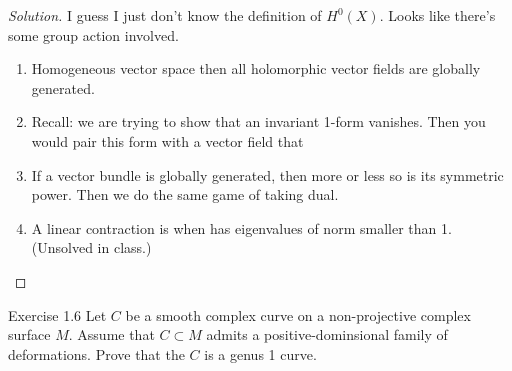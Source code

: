 \begin{proof}[Solution]\leavevmode
I guess I just don't know the definition of  \(H^{0}(X)\). Looks like there's some group action involved.
\begin{enumerate}[label=(\alph*)]
\item  Homogeneous vector space then all holomorphic vector fields are globally generated. 
\item {\color{6}Recall: we are trying to show that an invariant 1-form vanishes.} Then you would pair this form with a vector field that 
\item If a vector bundle is globally generated, then more or less so is its symmetric power. Then we do the same game of taking dual.
\item A linear contraction is when has eigenvalues of norm smaller than 1. (Unsolved in class.)
\end{enumerate}
\end{proof}


\begin{thing4}{Exercise 1.6}\label{exer:1.6}\leavevmode
Let $C$ be a smooth complex curve on a non-projective complex surface \(M\). Assume that \(C \subset M\) admits a positive-dominsional family of deformations. Prove that the $C$ is a genus 1 curve.
\end{thing4}

